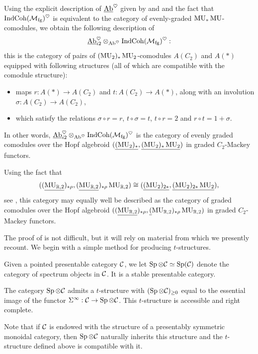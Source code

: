 Using the explicit description of $\underline{\mathrm{Ab}}^{\heartsuit}$ given by  and  and the fact that $\mathrm{IndCoh}(\mathcal{M}_{\mathrm{fg}})^{\heartsuit}$ is equivalent to the category of evenly-graded $\operatorname{\mathrm{MU}}_* \operatorname{\mathrm{MU}}$-comodules, we obtain the following description of
\[\underline{\mathrm{Ab}}_{i2}^{\heartsuit} \otimes_{\mathrm{Ab}^{\heartsuit}} \mathrm{IndCoh}(\mathcal{M}_{\mathrm{fg}})^{\heartsuit}:\]
this is the category of pairs of $(\operatorname{\mathrm{MU}}_2)_*\operatorname{\mathrm{MU}}_2$-comodules $A(C_2)$ and $A(\ast)$ equipped with following structures (all of which are compatible with the comodule structure):
\begin{itemize}
  \item maps $r : A(\ast) \to A(C_2)$ and $t : A(C_2) \to A(\ast)$, along with an involution $\sigma : A(C_2) \to A(C_2)$,
  \item which satisfy the relations $\sigma \circ r = r$, $t \circ \sigma = t$, $t \circ r = 2$ and $r \circ t = 1 + \sigma$.
\end{itemize}

In other words, $\underline{\mathrm{Ab}}^{\heartsuit}_{i2} \otimes_{\mathrm{Ab}^{\heartsuit}} \mathrm{IndCoh}(\mathcal{M}_{\mathrm{fg}})^{\heartsuit}$ is the category of evenly graded comodules over the Hopf algebroid $(\underline{(\operatorname{\mathrm{MU}}_2)_{*}}, \underline{(\operatorname{\mathrm{MU}}_2)_* \operatorname{\mathrm{MU}}_2})$ in graded $C_2$-Mackey functors.

\begin{rmk}
  Using the fact that $$((\underline{\operatorname{\mathrm{MU}}_{\mathbb{R},2}})_{*\rho}, (\underline{\operatorname{\mathrm{MU}}_{\mathbb{R},2}})_{*\rho} \operatorname{\mathrm{MU}}_{\mathbb{R},2}) \cong (\underline{(\operatorname{\mathrm{MU}}_2)_{2*}}, \underline{(\operatorname{\mathrm{MU}}_2)_{2*} \operatorname{\mathrm{MU}}_2}),$$ see \cite[Theorems 2.25 and 2.28]{HuKriz}, this category may equally well be described as the category of graded comodules over the Hopf algebroid $((\underline{\operatorname{\mathrm{MU}}_{\mathbb{R},2}})_{*\rho}, \underline({\operatorname{\mathrm{MU}}_{\mathbb{R},2}})_{*\rho} \operatorname{\mathrm{MU}}_{\mathbb{R},2})$ in graded $C_2$-Mackey functors.
\end{rmk}

The proof of  is not difficult, but it will rely on material from \cite[Appendix C]{SAG} which we presently recount. We begin with a simple method for producing $t$-structures. 

\begin{cnstr}
  Given a pointed presentable category $\mathcal{C}$, we let 
  $\operatorname{\mathrm{Sp}} \otimes \mathcal{C} \simeq \operatorname{\mathrm{Sp}}(\mathcal{C})$
  denote the category of spectrum objects in $\mathcal{C}$. It is a stable presentable category.

  The category $\operatorname{\mathrm{Sp}} \otimes \mathcal{C}$ admits a $t$-structure with $(\operatorname{\mathrm{Sp}} \otimes \mathcal{C})_{\geq 0}$ equal to the essential image of the functor $\Sigma^{\infty} : \mathcal{C} \to \operatorname{\mathrm{Sp}} \otimes \mathcal{C}$.
  This $t$-structure is accessible and right complete.

  Note that if $\mathcal{C}$ is endowed with the structure of a presentably symmetric monoidal category, then $\operatorname{\mathrm{Sp}} \otimes \mathcal{C}$ naturally inherits this structure and the $t$-structure defined above is compatible with it.
\end{cnstr}

